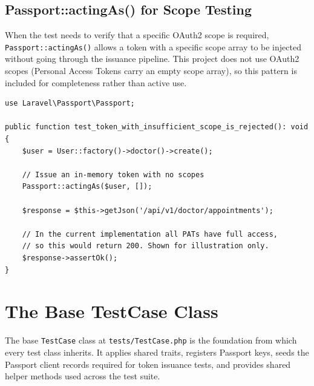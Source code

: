 \subsection{Passport::actingAs() for Scope Testing}

When the test needs to verify that a specific OAuth2 scope is required,
\texttt{Passport::actingAs()} allows a token with a specific scope
array to be injected without going through the issuance pipeline.
This project does not use OAuth2 scopes (Personal Access Tokens carry
an empty scope array), so this pattern is included for completeness
rather than active use.

\begin{lstlisting}[style=php, caption={\texttt{Passport::actingAs()}
  --- scope-aware authentication for hypothetical scope-gated endpoints.}]
use Laravel\Passport\Passport;

public function test_token_with_insufficient_scope_is_rejected(): void
{
    $user = User::factory()->doctor()->create();

    // Issue an in-memory token with no scopes
    Passport::actingAs($user, []);

    $response = $this->getJson('/api/v1/doctor/appointments');

    // In the current implementation all PATs have full access,
    // so this would return 200. Shown for illustration only.
    $response->assertOk();
}
\end{lstlisting}

\section{The Base TestCase Class}
\label{sec:base-testcase}

The base \texttt{TestCase} class at \texttt{tests/TestCase.php} is
the foundation from which every test class inherits. It applies shared
traits, registers Passport keys, seeds the Passport client records
required for token issuance tests, and provides shared helper methods
used across the test suite.

